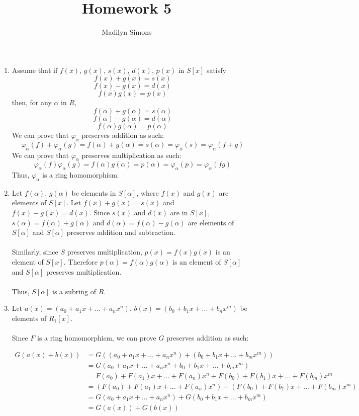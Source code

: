 \documentclass{article}
\title{Homework 5}
\author{Madilyn Simons}
\date{}
\begin{document}
\maketitle

\begin{enumerate}

\item Assume that if $f(x)$, $g(x)$, $s(x)$, $d(x)$, $p(x)$ in $S[x]$ satisfy
\[
f(x) + g(x) = s(x)
\] \[
f(x) - g(x) = d(x)
\] \[
f(x)g(x) = p(x)
\]
then, for any $\alpha$ in $R$,
\[
\] \[
f(\alpha) + g(\alpha) = s(\alpha)
\] \[
f(\alpha) - g(\alpha) = d(\alpha)
\] \[
f(\alpha)g(\alpha) = p(\alpha)
\]
We can prove that $\varphi_{\alpha}$ preserves addition as such:
\[
\varphi_{\alpha}(f) + \varphi_{\alpha}(g) = f(\alpha) + g(\alpha) = s(\alpha) = \varphi_{\alpha}(s) = \varphi_{\alpha}(f+g)
\]
We can prove that $\varphi_{\alpha}$ preserves multiplication as such:
\[
\varphi_{\alpha}(f)\varphi_{\alpha}(g) = f(\alpha)g(\alpha) = p(\alpha) = \varphi_{\alpha}(p) = \varphi_{\alpha}(fg)
\]
Thus, $\varphi_{\alpha}$ is a ring homomorphism.

\item Let $f(\alpha)$, $g(\alpha)$ be elements in $S[\alpha]$, where
$f(x)$ and $g(x)$ are elements of $S[x]$.
Let $f(x) + g(x) = s(x)$ and $f(x) - g(x) = d(x)$.  Since
$s(x)$ and $d(x)$ are in $S[x]$, $s(\alpha) = f(\alpha) + g(\alpha)$ and
$d(\alpha) = f(\alpha) - g(\alpha)$ are elements of $S[\alpha]$ and $S[\alpha]$
preserves addition and subtraction.
\\
\\
Similarly, since $S$ preserves multiplication, $p(x) = f(x)g(x)$
is an element of $S[x]$.  Therefore $p(\alpha) = f(\alpha)g(\alpha)$ is an
element of $S[\alpha]$ and $S[\alpha]$ preserves multiplication.
\\
\\
Thus, $S[\alpha]$ is a subring of $R$.




\item Let $a(x) = (a_0 + a_{1}x + ... + a_{n}x^n)$, $b(x) = (b_0 + b_{1}x + ... + b_{n}x^m)$
be elements of $R_{1}[x]$.
\\ \\
Since $F$ is a ring homomorphism, we can prove $G$ preserves addition as such:

\begin{align*}
G(a(x) + b(x)) &= G((a_0 + a_{1}x + ... + a_{n}x^{n}) + (b_0 + b_{1}x + ... + b_{m}x^{m})) \\
&= G(a_0 + a_{1}x + ... + a_{n}x^n + b_0 + b_{1}x + ... + b_{m}x^{m}) \\
&= F(a_{0}) + F(a_{1})x + ... + F(a_{n})x^{n} + F(b_{0}) + F(b_{1})x + ... + F(b_{m})x^{m} \\
&= (F(a_{0}) + F(a_{1})x + ... + F(a_{n})x^{n}) + (F(b_{0}) + F(b_{1})x + ... + F(b_{m})x^{m}) \\
&= G(a_0 + a_{1}x + ... + a_{n}x^{n}) + G(b_0 + b_{1}x + ... + b_{m}x^{m}) \\
&= G(a(x)) + G(b(x))
\end{align*}


\end{enumerate}
\end{document}
